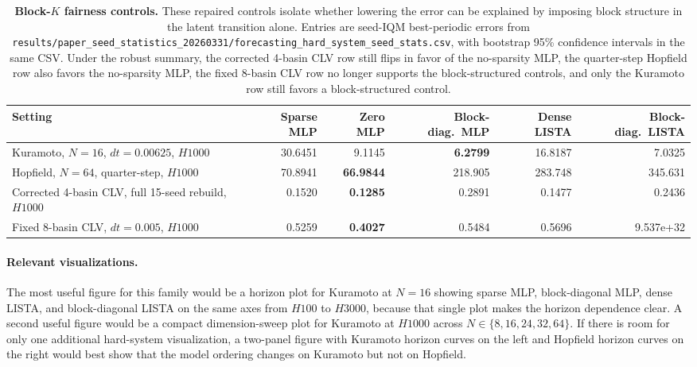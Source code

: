 \begin{table}[ht]
\centering
\scriptsize
\setlength{\tabcolsep}{4pt}
\begin{tabular}{p{}rrrrr}
\toprule
Setting & Sparse MLP & Zero MLP & Block-diag.\ MLP & Dense LISTA & Block-diag.\ LISTA \\
\midrule
Kuramoto, $N=16$, $dt=0.00625$, $H1000$ & 30.6451 & 9.1145 & \textbf{6.2799} & 16.8187 & 7.0325 \\
Hopfield, $N=64$, quarter-step, $H1000$ & 70.8941 & \textbf{66.9844} & 218.905 & 283.748 & 345.631 \\
Corrected 4-basin CLV, full 15-seed rebuild, $H1000$ & 0.1520 & \textbf{0.1285} & 0.2891 & 0.1477 & 0.2436 \\
Fixed 8-basin CLV, $dt=0.005$, $H1000$ & 0.5259 & \textbf{0.4027} & 0.5484 & 0.5696 & 9.537e+32 \\
\bottomrule
\end{tabular}
\caption{\textbf{Block-$K$ fairness controls.} These repaired controls isolate whether lowering the error can be explained by imposing block structure in the latent transition alone. Entries are seed-IQM best-periodic errors from \texttt{results/paper\_seed\_statistics\_20260331/forecasting\_hard\_system\_seed\_stats.csv}, with bootstrap 95\% confidence intervals in the same CSV. Under the robust summary, the corrected 4-basin CLV row still flips in favor of the no-sparsity MLP, the quarter-step Hopfield row also favors the no-sparsity MLP, the fixed 8-basin CLV row no longer supports the block-structured controls, and only the Kuramoto row still favors a block-structured control.}
\label{tab:review-hard-controls-20260314}
\end{table}

\paragraph{Relevant visualizations.}
The most useful figure for this family would be a horizon plot for Kuramoto at
$N=16$ showing sparse MLP, block-diagonal MLP, dense LISTA, and block-diagonal LISTA on the same
axes from $H100$ to $H3000$, because that single plot makes the horizon
dependence clear. A second useful figure would be a compact dimension-sweep
plot for Kuramoto at $H1000$ across $N \in \{8,16,24,32,64\}$. If there is room
for only one additional hard-system visualization, a two-panel figure with
Kuramoto horizon curves on the left and Hopfield horizon curves on the right
would best show that the model ordering changes on Kuramoto but not on
Hopfield.

